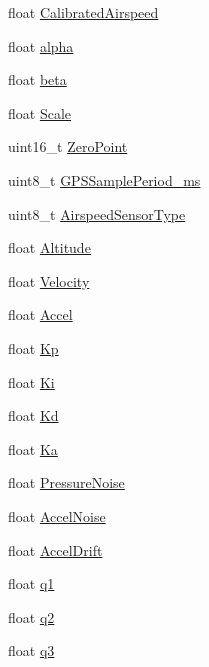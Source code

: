 \begin{DoxyCompactItemize}
float \hyperlink{struct____attribute_____a5c5a7f54f4401fa3ef55a9a784b9b1b0}{\-Calibrated\-Airspeed}
\item 
float \hyperlink{struct____attribute_____aed2862418ac6d8e0ca98131645e31c3b}{alpha}
\item 
float \hyperlink{struct____attribute_____a320b79908f216db8bead575dff9f4b89}{beta}
\item 
float \hyperlink{struct____attribute_____a30861efde2efd783124dbeb7e1725023}{\-Scale}
\item 
uint16\-\_\-t \hyperlink{struct____attribute_____aaa038632b9eeba4ceb451d352395c837}{\-Zero\-Point}
\item 
uint8\-\_\-t \hyperlink{struct____attribute_____a5d4a820a32e334841e9a01da5fee4ee7}{\-G\-P\-S\-Sample\-Period\-\_\-ms}
\item 
uint8\-\_\-t \hyperlink{struct____attribute_____a67ecc64c4ed5b91a9d60eb3a3e7eb8a0}{\-Airspeed\-Sensor\-Type}
\item 
float \hyperlink{struct____attribute_____a6df65b8c764a5d5cf17e244905eb25af}{\-Altitude}
\item 
float \hyperlink{struct____attribute_____a59fae582c2a213a1c04beaa1646c88ac}{\-Velocity}
\item 
float \hyperlink{struct____attribute_____a0335bf36bf8f2981b61316861d50a194}{\-Accel}
\item 
float \hyperlink{struct____attribute_____a514928f27484841c4cef0ff7051b234a}{\-Kp}
\item 
float \hyperlink{struct____attribute_____a2a28be37b896ead959f6ba8d73844008}{\-Ki}
\item 
float \hyperlink{struct____attribute_____ab6bf02cf758b5831d3f48560a7c7a626}{\-Kd}
\item 
float \hyperlink{struct____attribute_____ade6c290f80f7ebc6514ea09001d9770b}{\-Ka}
\item 
float \hyperlink{struct____attribute_____a6db1c1f224f8afefb3eb0aebb9b01693}{\-Pressure\-Noise}
\item 
float \hyperlink{struct____attribute_____acc365d09e02f1b8d0a9b56377c8a9724}{\-Accel\-Noise}
\item 
float \hyperlink{struct____attribute_____ab5140191f3fa2575a486cdb8d7e78159}{\-Accel\-Drift}
\item 
float \hyperlink{struct____attribute_____a3f0abcad63e3cc8003125c44dfe4f8ec}{q1}
\item 
float \hyperlink{struct____attribute_____a87cc07dcd069aa702766f473dcfb1503}{q2}
\item 
float \hyperlink{struct____attribute_____a2f02109202cab2a1752138bc83390485}{q3}

\end{DoxyCompactItemize}
